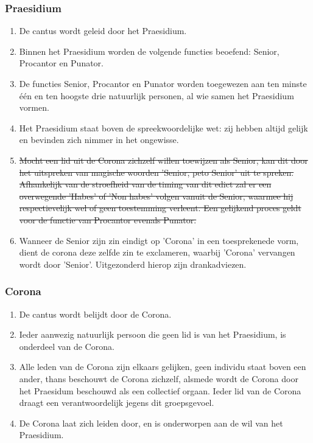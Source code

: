 \subsubsection*{Praesidium}
\footnotesize

\begin{enumerate}
    \item De cantus wordt geleid door het Praesidium.
    \item Binnen het Praesidium worden de volgende functies beoefend: Senior, Procantor en Punator.
    \item De functies Senior, Procantor en Punator worden toegewezen aan ten minste één en ten hoogste drie natuurlijk personen, al wie samen het Praesidium vormen.
    \item Het Praesidium staat boven de spreekwoordelijke wet: zij hebben altijd gelijk en bevinden zich nimmer in het ongewisse. 
    \item \sout{Mocht een lid uit de Corona zichzelf willen toewijzen als Senior, kan dit door het uitspreken van magische woorden 'Senior, peto Senior' uit te spreken. Afhankelijk van de stroefheid van de timing van dit edict zal er een overwegende 'Habes' of 'Non habes' volgen vanuit de Senior, waarmee hij respectievelijk wel of geen toestemming verleent. Een gelijkend proces geldt voor de functie van Procantor evenals Punator.} 
    \item Wanneer de Senior zijn zin eindigt op 'Corona' in een toesprekenede vorm, dient de corona deze zelfde zin te exclameren, waarbij 'Corona' vervangen wordt door 'Senior'. Uitgezonderd hierop zijn drankadviezen.
\end{enumerate}

\subsubsection*{Corona}
\begin{enumerate}
    \item De cantus wordt belijdt door de Corona.
    \item Ieder aanwezig natuurlijk persoon die geen lid is van het Praesidium, is onderdeel van de Corona. 
    \item Alle leden van de Corona zijn elkaars gelijken, geen individu staat boven een ander, thans beschouwt de Corona zichzelf, alsmede wordt de Corona door het Praesidum beschouwd als een collectief orgaan. Ieder lid van de Corona draagt een verantwoordelijk jegens dit groepsgevoel.
    \item De Corona laat zich leiden door, en is onderworpen aan de wil van het Praesidium.
\end{enumerate}

